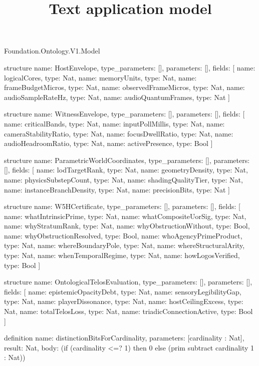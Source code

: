 \begin{lexlean}{Foundation.Ontology.V1.Model}
\title{Text application model}
\begin{semanticmodule}
structure{
  name: HostEnvelope,
  type_parameters: [],
  parameters: [],
  fields: [
    {name: logicalCores, type: Nat},
    {name: memoryUnits, type: Nat},
    {name: frameBudgetMicros, type: Nat},
    {name: observedFrameMicros, type: Nat},
    {name: audioSampleRateHz, type: Nat},
    {name: audioQuantumFrames, type: Nat}
  ]
}

structure{
  name: WitnessEnvelope,
  type_parameters: [],
  parameters: [],
  fields: [
    {name: criticalBands, type: Nat},
    {name: inputPollMillis, type: Nat},
    {name: cameraStabilityRatio, type: Nat},
    {name: focusDwellRatio, type: Nat},
    {name: audioHeadroomRatio, type: Nat},
    {name: activePresence, type: Bool}
  ]
}

structure{
  name: ParametricWorldCoordinates,
  type_parameters: [],
  parameters: [],
  fields: [
    {name: lodTargetRank, type: Nat},
    {name: geometryDensity, type: Nat},
    {name: physicsSubstepCount, type: Nat},
    {name: shadingQualityTier, type: Nat},
    {name: instanceBranchDensity, type: Nat},
    {name: precisionBits, type: Nat}
  ]
}

structure{
  name: W5HCertificate,
  type_parameters: [],
  parameters: [],
  fields: [
    {name: whatIntrinsicPrime, type: Nat},
    {name: whatCompositeUorSig, type: Nat},
    {name: whyStratumRank, type: Nat},
    {name: whyObstructionWithout, type: Bool},
    {name: whyObstructionResolved, type: Bool},
    {name: whoAgencyPrimeProduct, type: Nat},
    {name: whereBoundaryPole, type: Nat},
    {name: whereStructuralArity, type: Nat},
    {name: whenTemporalRegime, type: Nat},
    {name: howLogosVerified, type: Bool}
  ]
}

structure{
  name: OntologicalTelosEvaluation,
  type_parameters: [],
  parameters: [],
  fields: [
    {name: epistemicOpacityDebt, type: Nat},
    {name: sensoryLegibilityGap, type: Nat},
    {name: playerDissonance, type: Nat},
    {name: hostCeilingExcess, type: Nat},
    {name: totalTelosLoss, type: Nat},
    {name: triadicConnectionActive, type: Bool}
  ]
}

definition{
  name: distinctionBitsForCardinality,
  parameters: [cardinality : Nat],
  result: Nat,
  body: (if (cardinality <=? 1) then 0 else (prim subtract cardinality 1 : Nat))
}


\end{semanticmodule}
\end{lexlean}
